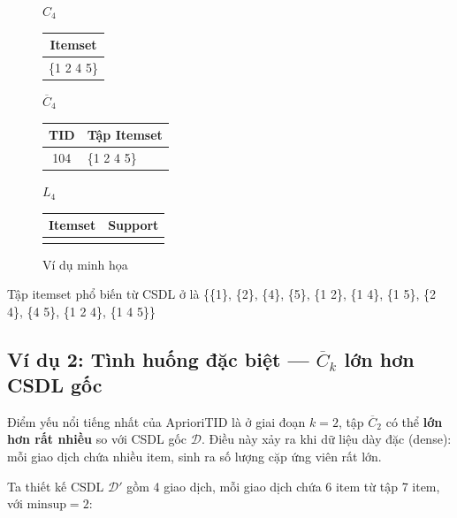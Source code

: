 \documentclass[12pt]{article}
\begin{document}
\begin{figure}[htbp]
    \begin{minipage}[t]{0.22\textwidth}
        \centering
        $C_4$\\[4pt]
        \begin{tabular}{|c|}
        \hline
        Itemset \\ \hline
        \{1 2 4 5\} \\ \hline
        \end{tabular}
    \end{minipage}
    \hfill
    \begin{minipage}[t]{0.45\textwidth}
        \centering
        $\overline{C}_4$\\[4pt]
        \begin{tabular}{|c|l|}
        \hline
        TID & Tập Itemset \\ \hline
        104 & \{1 2 4 5\} \\ \hline
        \end{tabular}
    \end{minipage}
    \hfill
    \begin{minipage}[t]{0.25\textwidth}
        \centering
        $L_4$\\[4pt]
        \begin{tabular}{|c|c|}
        \hline
        Itemset & Support \\ \hline
        & \\ \hline
        \end{tabular}
    \end{minipage}

    \caption{Ví dụ minh họa}
    \label{fig:example}
\end{figure}

Tập itemset phổ biến từ CSDL ở  là \{\{1\}, \{2\}, \{4\}, \{5\}, \{1 2\}, \{1 4\}, \{1 5\}, \{2 4\}, \{4 5\}, \{1 2 4\}, \{1 4 5\}\}

\subsection{Ví dụ 2: Tình huống đặc biệt --- $\overline{C}_k$ lớn hơn CSDL gốc}

Điểm yếu nổi tiếng nhất của AprioriTID là ở giai đoạn $k=2$, tập $\overline{C}_2$ có thể \textbf{lớn hơn rất nhiều} so với CSDL gốc $\mathcal{D}$. Điều này xảy ra khi dữ liệu dày đặc (dense): mỗi giao dịch chứa nhiều item, sinh ra số lượng cặp ứng viên rất lớn.

Ta thiết kế CSDL $\mathcal{D}'$ gồm 4 giao dịch, mỗi giao dịch chứa 6 item từ tập 7 item, với $\text{minsup} = 2$:
\end{document}
